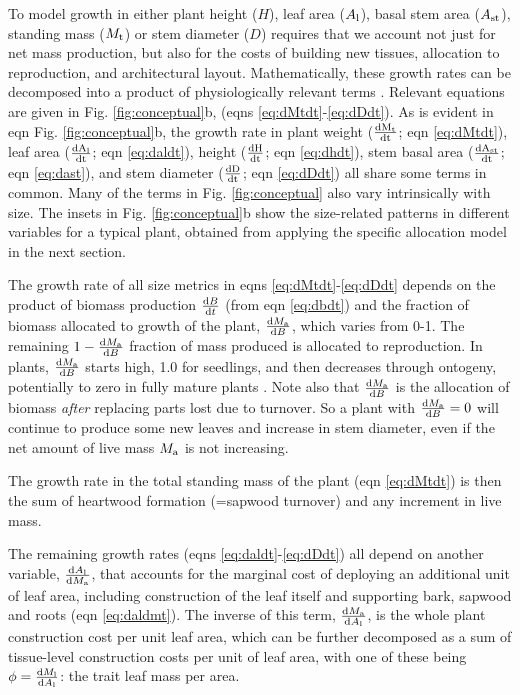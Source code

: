 \documentclass[a4paper,11pt]{article}
\begin{document}
To model growth in either plant height ($H$), leaf area ($A_{\rm l}$), basal stem area ($ A_{\rm st}$), standing mass ($M_{\rm t}$) or stem diameter ($D$) requires that we account not just for net mass production, but also for the costs of building new tissues, allocation to reproduction, and architectural layout. Mathematically, these growth rates can be decomposed into a product of physiologically relevant terms \citep{Falster-2011, Gibert-2016}. Relevant equations are given in Fig. \ref{fig:conceptual}b, (eqns \ref{eq:dMtdt}-\ref{eq:dDdt}). As is evident in eqn  Fig. \ref{fig:conceptual}b, the growth rate in plant weight ($\frac{\rm{d} M_{\rm t} }{\rm{d} t}$; eqn \ref{eq:dMtdt}), leaf area ($\frac{\rm{d} A_{\rm l}}{\rm{d} t}$; eqn \ref{eq:daldt}), height ($\frac{\rm{d} H}{\rm{d} t}$; eqn \ref{eq:dhdt}), stem basal area ($\frac{\rm{d}  A_{\rm st}}{\rm{d} t}$; eqn \ref{eq:dast}), and stem diameter ($\frac{\rm{d} D}{\rm{d} t}$; eqn \ref{eq:dDdt}) all share some terms in common. Many of the terms in Fig. \ref{fig:conceptual} also vary intrinsically with size. The insets in Fig. \ref{fig:conceptual}b show the size-related patterns in different variables for a typical plant, obtained from applying the specific allocation model in the next section.

The growth rate of all size metrics in eqns \ref{eq:dMtdt}-\ref{eq:dDdt} depends on the product of biomass production $\frac{{\rm d}B} {{\rm d}t}$ (from eqn \ref{eq:dbdt}) and the fraction of biomass allocated to growth of the plant, $\frac{{\rm d}M_{\rm a}}{{\rm d}B}$, which varies from 0-1. The remaining  $1- \frac{{\rm d}M_{\rm a}}{{\rm d}B}$ fraction of mass produced is allocated to reproduction. In plants, $\frac{{\rm d}M_{\rm a}}{{\rm d}B}$ starts high, 1.0 for seedlings, and then decreases through ontogeny, potentially to zero in fully mature plants \citep{Wenk-2015}. Note also that $\frac{{\rm d}M_{\rm a}}{{\rm d}B}$ is the allocation of biomass \emph{after} replacing parts lost due to turnover. So a plant with $\frac{{\rm d}M_{\rm a}}{{\rm d}B}=0$ will continue to produce some new leaves and increase in stem diameter, even if the net amount of live mass $M_{\rm a}$ is not increasing.

The growth rate in the total standing mass of the plant (eqn \ref{eq:dMtdt}) is then the sum of heartwood formation (=sapwood turnover) and any increment in live mass.

The remaining growth rates (eqns \ref{eq:daldt}-\ref{eq:dDdt}) all depend on another variable, $\frac{{\rm d}A_{\rm l}} {{\rm d}M_{\rm a}}$, that accounts for the marginal cost of deploying an additional unit of leaf area, including construction of the leaf itself and supporting  bark, sapwood and roots (eqn \ref{eq:daldmt}). The inverse of this term, $\frac{{\rm d}M_{\rm a} }{{\rm d}A_{\rm l}}$, is the whole plant construction cost per unit leaf area, which can be further decomposed as a sum of tissue-level construction costs per unit of leaf area, with one of these being $\phi = \frac{{\rm d}M_{\rm l} }{{\rm d}A_{\rm l}}$: the trait leaf mass per area.
\end{document}
